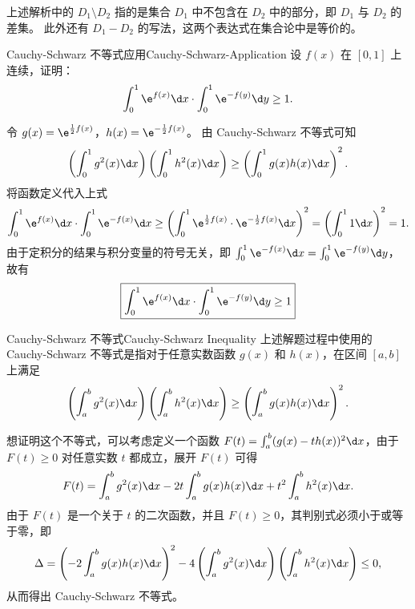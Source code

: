 \begin{note}{}{}
    上述解析中的 $D_1 \setminus D_2$ 指的是集合 $D_1$ 中不包含在 $D_2$ 中的部分，即 $D_1$ 与 $D_2$ 的差集。
    此外还有 $D_1 - D_2$ 的写法，这两个表达式在集合论中是等价的。

\end{note}


\begin{problem}{Cauchy-Schwarz 不等式应用}{Cauchy-Schwarz-Application}
    设 $f(x)$ 在 $[0, 1]$ 上连续，证明：
    \begin{equation}
        \int_0^1 \e^{f(x)} \d x \cdot \int_0^1 \e^{-f(y)} \d y \ge 1.
    \end{equation}
\end{problem}

\begin{myproof}
    令 $g(x) = \e^{\frac{1}{2} f(x)}$，$h(x) = \e^{-\frac{1}{2} f(x)}$。
    由 Cauchy-Schwarz 不等式可知
    \begin{equation}
        \left( \int_0^1 g^2(x) \d x \right) \left( \int_0^1 h^2(x) \d x \right) \ge \left( \int_0^1 g(x) h(x) \d x \right)^2.
    \end{equation}
    将函数定义代入上式
    \begin{equation}
        \int_0^1 \e^{f(x)} \d x \cdot \int_0^1 \e^{-f(x)} \d x \ge \left( \int_0^1 \e^{\frac{1}{2} f(x)} \cdot \e^{-\frac{1}{2} f(x)} \d x \right)^2 = \left( \int_0^1 1 \d x \right)^2 = 1.
    \end{equation}
    由于定积分的结果与积分变量的符号无关，即 $\int_0^1 \e^{-f(x)} \d x = \int_0^1 \e^{-f(y)} \d y$，故有
    \begin{equation}
        \boxed{\int_0^1 \e^{f(x)} \d x \cdot \int_0^1 \e^{-f(y)} \d y \ge 1}
    \end{equation}
\end{myproof}

\begin{note}{Cauchy-Schwarz 不等式}{Cauchy-Schwarz Inequality}
    上述解题过程中使用的 Cauchy-Schwarz 不等式是指对于任意实数函数 $g(x)$ 和 $h(x)$，在区间 $[a, b]$ 上满足
    \begin{equation}
        \left( \int_a^b g^2(x) \d x \right) \left( \int_a^b h^2(x) \d x \right) \ge \left( \int_a^b g(x) h(x) \d x \right)^2.
    \end{equation}

    想证明这个不等式，可以考虑定义一个函数 $F(t) = \int_a^b (g(x) - t h(x))^2 \d x$，由于 $F(t) \ge 0$ 对任意实数 $t$ 都成立，展开 $F(t)$ 可得
    \begin{equation}
        F(t) = \int_a^b g^2(x) \d x - 2t \int_a^b g(x) h(x) \d x + t^2 \int_a^b h^2(x) \d x.
    \end{equation}
    由于 $F(t)$ 是一个关于 $t$ 的二次函数，并且 $F(t) \ge 0$，其判别式必须小于或等于零，即
    \begin{equation}
        \Delta = \left( -2 \int_a^b g(x) h(x) \d x \right)^2 - 4 \left( \int_a^b g^2(x) \d x \right) \left( \int_a^b h^2(x) \d x \right) \le 0,
    \end{equation}
    从而得出 Cauchy-Schwarz 不等式。

\end{note}


